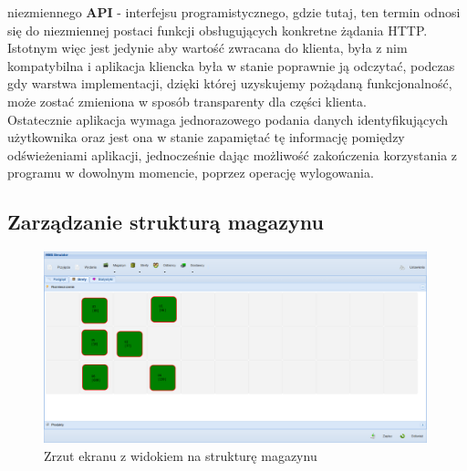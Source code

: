 		niezmiennego \textbf{API} - interfejsu programistycznego, gdzie tutaj, ten termin odnosi się
		do niezmiennej postaci funkcji obsługujących konkretne żądania HTTP.
		Istotnym więc jest jedynie aby wartość zwracana do klienta, była
		z nim kompatybilna i aplikacja kliencka była w stanie poprawnie ją odczytać, podczas gdy warstwa
		implementacji, dzięki której uzyskujemy pożądaną funkcjonalność,
		może zostać zmieniona w sposób transparenty dla części klienta. \\
		Ostatecznie aplikacja wymaga jednorazowego podania danych identyfikujących użytkownika oraz
		jest ona w stanie zapamiętać tę informację pomiędzy odświeżeniami aplikacji, jednocześnie
		dając możliwość zakończenia korzystania z programu w dowolnym momencie, poprzez operację
		wylogowania.
		
	\subsection{Zarządzanie strukturą magazynu}
		\begin{figure}[H]
			\centering
			\includegraphics[width=0.99\textwidth]{images/app/unit_preview}
			\caption[Aplikacja - Zarządzania strukturą magazynu]{Zrzut ekranu z widokiem na strukturę magazynu}
			\label{c7:fig:app:unit_preview}
		\end{figure}
		

